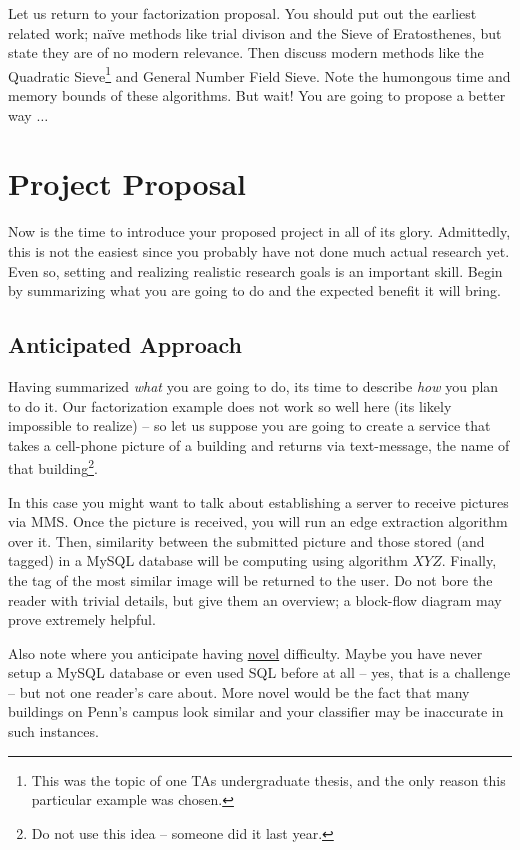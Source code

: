 \documentclass{sig-alternate}
\begin{document}
Let us return to your factorization proposal. You should put out the earliest related work; na\"{i}ve methods like trial divison and the Sieve of Eratosthenes, but state they are of no modern relevance. Then discuss modern methods like the Quadratic Sieve\footnote{This was the topic of one TAs undergraduate thesis, and the only reason this particular example was chosen.} and General Number Field Sieve. Note the humongous time and memory bounds of these algorithms. But wait! You are going to propose a better way $\ldots$

\section{Project Proposal}
\label{sec:project_proposal}
Now is the time to introduce your proposed project in all of its glory. Admittedly, this is not the easiest since you probably have not done much actual research yet. Even so, setting and realizing realistic research goals is an important skill. Begin by summarizing what you are going to do and the expected benefit it will bring.

\subsection{Anticipated Approach}
\label{subsec:approach}
Having summarized \textit{what} you are going to do, its time to describe \textit{how} you plan to do it. Our factorization example does not work so well here (its likely impossible to realize) -- so let us suppose you are going to create a service that takes a cell-phone picture of a building and returns via text-message, the name of that building\footnote{Do not use this idea -- someone did it last year.}. 

In this case you might want to talk about establishing a server to receive pictures via MMS. Once the picture is received, you will run an edge extraction algorithm over it. Then, similarity between the submitted picture and those stored (and tagged) in a MySQL database will be computing using algorithm $XYZ$. Finally, the tag of the most similar image will be returned to the user. Do not bore the reader with trivial details, but give them an overview; a block-flow diagram may prove extremely helpful.

Also note where you anticipate having \underline{novel} difficulty. Maybe you have never setup a MySQL database or even used SQL before at all -- yes, that is a challenge -- but not one reader's care about. More novel would be the fact that many buildings on Penn's campus look similar and your classifier may be inaccurate in such instances.
\end{document}

